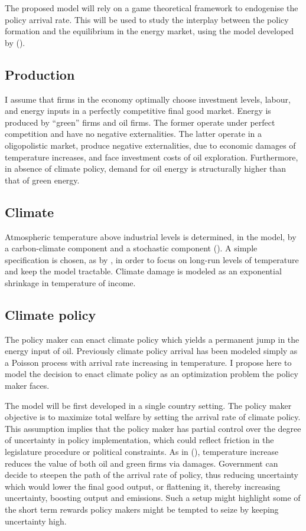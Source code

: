 \documentclass[american]{scrartcl}
\newcommand{\citein}[1]{\citeauthor{#1} (\citeyear{#1})}
\begin{document}
The proposed model will rely on a game theoretical framework to endogenise the policy arrival rate. This will be used to study the interplay between the policy formation and the equilibrium in the energy market, using the model developed by \citein{Barnett2019}.

\subsection{Production}

I assume that firms in the economy optimally choose investment levels, labour, and energy inputs in a perfectly competitive final good market. Energy is produced by ``green'' firms and oil firms. The former operate under perfect competition and have no negative externalities. The latter operate in a oligopolistic market, produce negative externalities, due to economic damages of temperature increases, and face investment costs of oil exploration. Furthermore, in absence of climate policy, demand for oil energy is structurally higher than that of green energy.

\subsection{Climate}

Atmospheric temperature above industrial levels is determined, in the model, by a carbon-climate component and a stochastic component (\cite{MacDougall2015}). A simple specification is chosen, as by , in order to focus on long-run levels of temperature and keep the model tractable. Climate damage is modeled as an exponential shrinkage in temperature of income.

\subsection{Climate policy}

The policy maker can enact climate policy which yields a permanent jump in the energy input of oil. Previously climate policy arrival has been modeled simply as a Poisson process with arrival rate increasing in temperature. I propose here to model the decision to enact climate policy as an optimization problem the policy maker faces.

The model will be first developed in a single country setting. The policy maker objective is to maximize total welfare by setting the arrival rate of climate policy. This assumption implies that the policy maker has partial control over the degree of uncertainty in policy implementation, which could reflect friction in the legislature procedure or political constraints. As in \citein{Barnett2019}, temperature increase reduces the value of both oil and green firms via damages. Government can decide to steepen the path of the arrival rate of policy, thus reducing uncertainty which would lower the final good output, or flattening it, thereby increasing uncertainty, boosting output and emissions. Such a setup might highlight some of the short term rewards policy makers might be tempted to seize by keeping uncertainty high.
\end{document}
